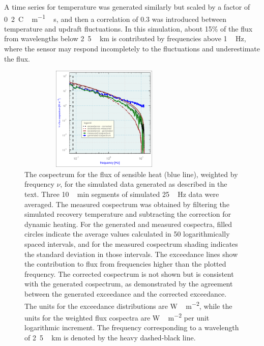 \documentclass[amt, manuscript]{copernicus}
\begin{document}
A time series for temperature was generated similarly but scaled by a
factor of \unit{0.2^{\circ}C\,m^{-1}\,s}, and then a correlation of 0.3
was introduced between temperature and updraft fluctuations. In this
simulation, about 15\% of the flux from wavelengths below \unit{2.5\,km}
is contributed by frequencies above \unit{1\,Hz}, where the sensor may
respond incompletely to the fluctuations and underestimate the flux.

\begin{figure}

\begin{center}\includegraphics[width=8.3cm,height=5cm]{figure/fig10} \end{center}
\caption{The cospectrum for the flux of sensible heat (blue line), weighted by frequency $\nu$, for the simulated data generated as described in the text. Three \unit{10\,min} segments of simulated \unit{25\,Hz} data were averaged. The measured cospectrum was obtained by filtering the simulated recovery temperature and subtracting the correction for dynamic heating. For the generated and measured cospectra, filled circles indicate the average values calculated in 50 logarithmically spaced intervals, and for the measured cospectrum shading indicates the standard deviation in those intervals. The exceedance lines show the contribution to flux from frequencies higher than the plotted frequency. The corrected cospectrum is not shown but is consistent with the generated cospectrum, as demonstrated by the agreement between the generated exceedance and the corrected exceedance. The units for the exceedance distributions are \unit{W\,m^{-2}}, while the units for the weighted flux cospectra are \unit{W\,m^{-2}} per unit logarithmic increment. The frequency corresponding to a wavelength of \unit{2.5\,km} is denoted by the heavy dashed-black line.\label{fig:simF}}
\end{figure}
\end{document}
